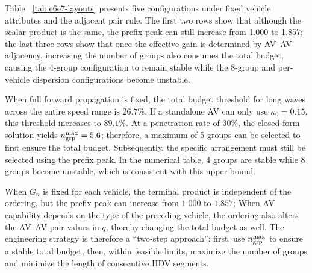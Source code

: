 \documentclass[11pt,a4paper,openany]{book}
\numberwithin{equation}{chapter}
\numberwithin{figure}{chapter}
\numberwithin{table}{chapter}
\begin{document}
Table ~\ref{tab:e6e7-layouts} presents five configurations under fixed vehicle attributes and the adjacent pair rule. The first two rows show that although the scalar product is the same, the prefix peak can still increase from 1.000 to 1.857; the last three rows show that once the effective gain is determined by AV–AV adjacency, increasing the number of groups also consumes the total budget, causing the 4-group configuration to remain stable while the 8-group and per-vehicle dispersion configurations become unstable.










\begin{tcolorbox}[experimentbox,title=\textbf{E7 Permeability and Number of Groups Results}]

When full forward propagation is fixed, the total budget threshold for long waves across the entire speed range is $26.7\%$. If a standalone AV can only use $\kappa_0=0.15$, this threshold increases to $89.1\%$. At a penetration rate of $30\%$, the closed-form solution yields $n_{\rm grp}^{\max}=5.6$; therefore, a maximum of 5 groups can be selected to first ensure the total budget. Subsequently, the specific arrangement must still be selected using the prefix peak. In the numerical table, 4 groups are stable while 8 groups become unstable, which is consistent with this upper bound.







\end{tcolorbox}

\begin{tcolorbox}[resultbox,title=\textbf{Verification Conclusions}]

When $G_n$ is fixed for each vehicle, the terminal product is independent of the ordering, but the prefix peak can increase from $1.000$ to $1.857$; When AV capability depends on the type of the preceding vehicle, the ordering also alters the AV–AV pair values in $q$, thereby changing the total budget as well. The engineering strategy is therefore a “two-step approach”: first, use $n_{\rm grp}^{\max}$ to ensure a stable total budget, then, within feasible limits, maximize the number of groups and minimize the length of consecutive HDV segments.







\end{tcolorbox}
\end{document}
